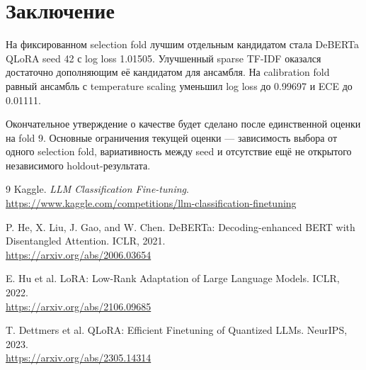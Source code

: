 \documentclass[a4paper,11pt]{article}
\begin{document}
\section{Заключение}

На фиксированном selection fold лучшим отдельным кандидатом стала DeBERTa QLoRA
seed 42 с log loss 1.01505. Улучшенный sparse TF-IDF оказался достаточно
дополняющим её кандидатом для ансамбля. На calibration fold равный ансамбль с
temperature scaling уменьшил log loss до 0.99697 и ECE до 0.01111.

Окончательное утверждение о качестве будет сделано после единственной оценки
на fold 9. Основные ограничения текущей оценки --- зависимость выбора от одного
selection fold, вариативность между seed и отсутствие ещё не открытого
независимого holdout-результата.

{\footnotesize
\clearpage
\begin{thebibliography}{9}
Kaggle. \emph{LLM Classification Fine-tuning}.\\
\url{https://www.kaggle.com/competitions/llm-classification-finetuning}

P. He, X. Liu, J. Gao, and W. Chen. DeBERTa: Decoding-enhanced BERT with
Disentangled Attention. ICLR, 2021.\\
\url{https://arxiv.org/abs/2006.03654}

E. Hu et al. LoRA: Low-Rank Adaptation of Large Language Models. ICLR, 2022.\\
\url{https://arxiv.org/abs/2106.09685}

T. Dettmers et al. QLoRA: Efficient Finetuning of Quantized LLMs. NeurIPS, 2023.\\
\url{https://arxiv.org/abs/2305.14314}
\end{thebibliography}
}
\end{document}
